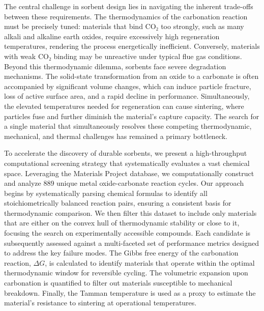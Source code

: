 \documentclass[]{article}
\begin{document}
The central challenge in sorbent design lies in navigating the inherent trade-offs between these requirements. The thermodynamics of the carbonation reaction must be precisely tuned: materials that bind CO₂ too strongly, such as many alkali and alkaline earth oxides, require excessively high regeneration temperatures, rendering the process energetically inefficient. Conversely, materials with weak CO₂ binding may be unreactive under typical flue gas conditions. Beyond this thermodynamic dilemma, sorbents face severe degradation mechanisms. The solid-state transformation from an oxide to a carbonate is often accompanied by significant volume changes, which can induce particle fracture, loss of active surface area, and a rapid decline in performance. Simultaneously, the elevated temperatures needed for regeneration can cause sintering, where particles fuse and further diminish the material's capture capacity. The search for a single material that simultaneously resolves these competing thermodynamic, mechanical, and thermal challenges has remained a primary bottleneck.

To accelerate the discovery of durable sorbents, we present a high-throughput computational screening strategy that systematically evaluates a vast chemical space. Leveraging the Materials Project database, we computationally construct and analyze 889 unique metal oxide-carbonate reaction cycles. Our approach begins by systematically parsing chemical formulas to identify all stoichiometrically balanced reaction pairs, ensuring a consistent basis for thermodynamic comparison. We then filter this dataset to include only materials that are either on the convex hull of thermodynamic stability or close to it, focusing the search on experimentally accessible compounds. Each candidate is subsequently assessed against a multi-faceted set of performance metrics designed to address the key failure modes. The Gibbs free energy of the carbonation reaction, $\Delta G$, is calculated to identify materials that operate within the optimal thermodynamic window for reversible cycling. The volumetric expansion upon carbonation is quantified to filter out materials susceptible to mechanical breakdown. Finally, the Tamman temperature is used as a proxy to estimate the material's resistance to sintering at operational temperatures.
\end{document}
